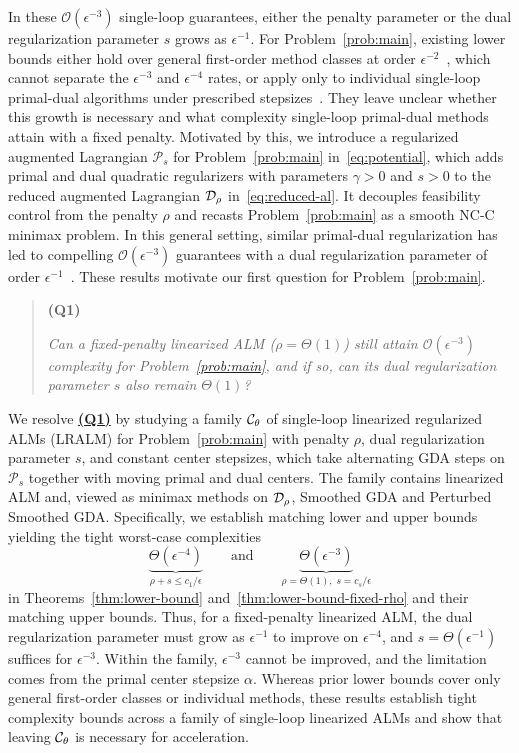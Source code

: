 In these \(\mathcal O(\epsilon^{-3})\) single-loop guarantees, either
the penalty parameter or the dual regularization parameter \(s\) grows as
\(\epsilon^{-1}\). For Problem~\eqref{prob:main}, existing lower bounds
either hold over general first-order method classes at
order \(\epsilon^{-2}\)~\cite{carmon2020lower,liu2026lower}, which cannot separate
the \(\epsilon^{-3}\) and \(\epsilon^{-4}\) rates, or apply only to
individual single-loop primal-dual algorithms under prescribed
stepsizes~\cite{mahdavinia2022tight,li2026smoothing}. They leave unclear
whether this growth is necessary and what complexity single-loop
primal-dual methods attain with a fixed penalty. Motivated by this,
we introduce a regularized augmented Lagrangian \(\mathcal P_s\) for
Problem~\eqref{prob:main} in~\eqref{eq:potential}, which adds primal and
dual quadratic regularizers with parameters \(\gamma>0\) and \(s>0\) to
the reduced augmented Lagrangian \(\mathcal{D}_\rho\) in~\eqref{eq:reduced-al}. It
decouples feasibility control from the penalty \(\rho\) and recasts
Problem~\eqref{prob:main} as a smooth NC-C minimax problem. In this general
setting, similar primal-dual regularization has led to
compelling \(\mathcal O(\epsilon^{-3})\) guarantees with a dual regularization
parameter of order \(\epsilon^{-1}\)~\cite{li2026smoothing}. These results
motivate our first question for Problem~\eqref{prob:main}.
\begin{quote}
  \hypertarget{Q1}{\textbf{(Q1)}}
  \emph{Can a fixed-penalty linearized ALM (\(\rho=\Theta(1)\)) still
  attain \(\mathcal O(\epsilon^{-3})\) complexity for Problem~\eqref{prob:main},
  and if so, can its dual regularization parameter \(s\) also remain
  \(\Theta(1)\)?}
\end{quote}

We resolve \hyperlink{Q1}{\textbf{(Q1)}} by studying a family \(\mathcal{C}_\theta\)
of single-loop linearized regularized ALMs (LRALM) for
Problem~\eqref{prob:main} with penalty \(\rho\), dual regularization parameter
\(s\), and constant center stepsizes, which take alternating GDA steps on
\(\mathcal P_s\) together with moving primal and dual centers. The family contains linearized ALM
and, viewed as minimax methods on \(\mathcal{D}_\rho\), Smoothed GDA and Perturbed
Smoothed GDA. Specifically, we establish matching
lower and upper bounds yielding the tight worst-case complexities  
\[
    \underbrace{\Theta(\epsilon^{-4})}_{\rho+s\le c_1/\epsilon} 
    \qquad\text{and}\qquad
    \underbrace{\Theta(\epsilon^{-3})}_{\rho=\Theta(1),\; s=c_s/\epsilon}
\]
in Theorems~\ref{thm:lower-bound} and~\ref{thm:lower-bound-fixed-rho} and their
matching upper bounds. Thus, for a fixed-penalty linearized ALM, the dual
regularization parameter must grow as \(\epsilon^{-1}\) to improve on
\(\epsilon^{-4}\), and \(s=\Theta(\epsilon^{-1})\) suffices for \(\epsilon^{-3}\).
Within the family, \(\epsilon^{-3}\) cannot be improved, and the limitation comes
from the primal center stepsize \(\alpha\). Whereas prior lower bounds cover only
general first-order classes or individual methods, these results establish tight
complexity bounds across a family of single-loop linearized ALMs and show that
leaving \(\mathcal{C}_\theta\) is necessary for acceleration.

